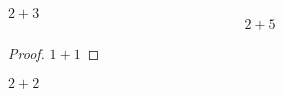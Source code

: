\documentclass{article}
\begin{document}
\begin{theorem}
$2+3$
$$2+5$$
\end{theorem}
\begin{proof}
$1+1$
\end{proof}
\begin{lemma}
$2+2$
\end{lemma}
\end{document}
